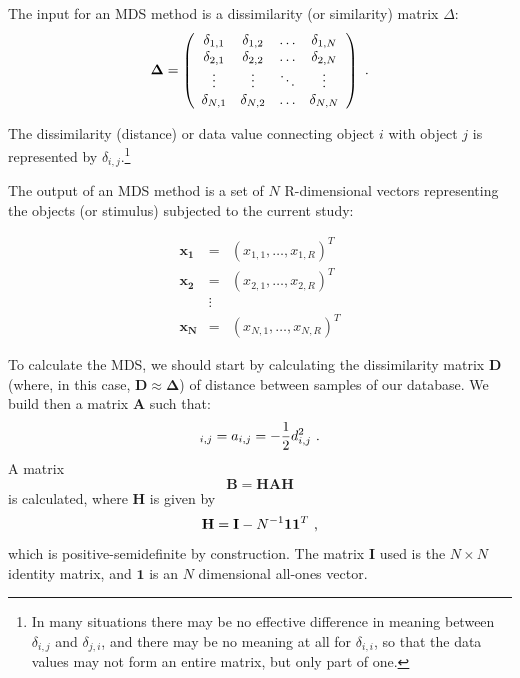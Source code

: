 The input for an MDS method is a dissimilarity (or similarity) matrix $\Delta$:
\begin{equation}
  	\mathbf{\Delta} = 
\left( \begin{array}{cccc}
\delta_{1,1} & \delta_{1,2} & \ldots & \delta_{1,N} \\
\delta_{2,1} & \delta_{2,2} & \ldots & \delta_{2,N} \\
\vdots       & \vdots       & \ddots & \vdots       \\
\delta_{N,1} & \delta_{N,2} & \ldots & \delta_{N,N} \\
\end{array} \right) \textmd{ .}
\end{equation}
  
The dissimilarity (distance) or data value connecting object $i$ with object $j$ is represented by $\delta_{i,j}$.\footnote{In many situations there may be no effective difference in meaning between $\delta_{i,j}$ and $\delta_{j,i}$, and there may be no meaning at all for $\delta_{i,i}$, so that the data values may not form an entire matrix, but only part of one.}

The output of an MDS method is a set of $N$ R-dimensional vectors representing the objects (or stimulus) subjected to the current study:
  
  \begin{eqnarray}
  \mathbf{x_1} &=& \left( x_{1,1}, \ldots, x_{1,R} \right)^T \nonumber \\
  \mathbf{x_2} &=& \left( x_{2,1}, \ldots, x_{2,R} \right)^T \nonumber \\
   &\vdots&  \\
  \mathbf{x_N} &=& \left( x_{N,1}, \ldots, x_{N,R} \right)^T \nonumber
  \end{eqnarray}

To calculate the MDS, we should start by calculating the dissimilarity matrix $\mathbf{D}$ (where, in this case, $\mathbf{D} \approx \mathbf{\Delta}$) of distance between samples of our database. We build then a matrix $\mathbf{A}$ such that: 
\begin{equation}
[\mathbf{A}]_{i,j}=a_{i,j}=-\frac{1}{2}d_{i,j}^2 \textmd{ .}
\end{equation}
A matrix 
\begin{equation}
\mathbf{B}=\mathbf{HAH}
\end{equation}
is calculated, where $\mathbf{H}$ is given by 
\begin{equation}
\mathbf{H} = \mathbf{I} - N^{-1}\mathbf{1}\mathbf{1}^T \textmd{ ,}
\end{equation}
which is positive-semidefinite by construction. 
The matrix $\mathbf{I}$ used is the $N \times N$ identity matrix, and $\mathbf{1}$ is an $N$ dimensional all-ones vector.

